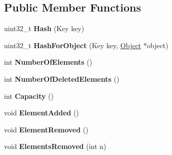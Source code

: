 \subsection*{Public Member Functions}
\begin{DoxyCompactItemize}
\item 
\hypertarget{classv8_1_1internal_1_1_hash_table_a79040f71245c3d19f0936bdd69028834}{}uint32\+\_\+t {\bfseries Hash} (Key key)\label{classv8_1_1internal_1_1_hash_table_a79040f71245c3d19f0936bdd69028834}

\item 
\hypertarget{classv8_1_1internal_1_1_hash_table_a7b871d5478daf0f214436ce99401b5fb}{}uint32\+\_\+t {\bfseries Hash\+For\+Object} (Key key, \hyperlink{classv8_1_1internal_1_1_object}{Object} $\ast$object)\label{classv8_1_1internal_1_1_hash_table_a7b871d5478daf0f214436ce99401b5fb}

\item 
\hypertarget{classv8_1_1internal_1_1_hash_table_aecb6c7546ed92f5a96dad038a897bafb}{}int {\bfseries Number\+Of\+Elements} ()\label{classv8_1_1internal_1_1_hash_table_aecb6c7546ed92f5a96dad038a897bafb}

\item 
\hypertarget{classv8_1_1internal_1_1_hash_table_a64ddc3cae67896d46de1b9e95f0351fb}{}int {\bfseries Number\+Of\+Deleted\+Elements} ()\label{classv8_1_1internal_1_1_hash_table_a64ddc3cae67896d46de1b9e95f0351fb}

\item 
\hypertarget{classv8_1_1internal_1_1_hash_table_a24d7c64fce515919fae69006c90bfef7}{}int {\bfseries Capacity} ()\label{classv8_1_1internal_1_1_hash_table_a24d7c64fce515919fae69006c90bfef7}

\item 
\hypertarget{classv8_1_1internal_1_1_hash_table_a44ea9f1a7eb8470d56bf1015d82d7c72}{}void {\bfseries Element\+Added} ()\label{classv8_1_1internal_1_1_hash_table_a44ea9f1a7eb8470d56bf1015d82d7c72}

\item 
\hypertarget{classv8_1_1internal_1_1_hash_table_adfa4875a7434c269d23bc1c3f7289304}{}void {\bfseries Element\+Removed} ()\label{classv8_1_1internal_1_1_hash_table_adfa4875a7434c269d23bc1c3f7289304}

\item 
\hypertarget{classv8_1_1internal_1_1_hash_table_ada08920d363bd3c05529d63414943d84}{}void {\bfseries Elements\+Removed} (int n)\label{classv8_1_1internal_1_1_hash_table_ada08920d363bd3c05529d63414943d84}


\end{DoxyCompactItemize}
